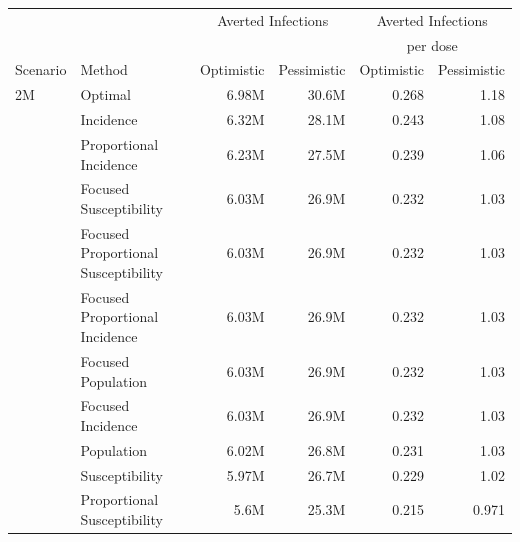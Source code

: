 
\begin{fwtable}
\centering
\small
\begin{tabular}{llrrrr}
\toprule
& {} & \multicolumn{2}{c}{Averted Infections} & \multicolumn{2}{c}{Averted Infections} \\
&    &  & & \multicolumn{2}{c}{per dose} \\
Scenario & Method &  Optimistic & Pessimistic &     Optimistic & Pessimistic          \\
\midrule
2M & Optimal &   6.98M &    30.6M &          0.268 &        1.18 \\
        & Incidence &   6.32M &    28.1M &          0.243 &        1.08 \\
        & Proportional Incidence &   6.23M &    27.5M &          0.239 &        1.06 \\
        & Focused Susceptibility &   6.03M &    26.9M &          0.232 &        1.03 \\
        & Focused Proportional Susceptibility &   6.03M &    26.9M &          0.232 &        1.03 \\
        & Focused Proportional Incidence &   6.03M &    26.9M &          0.232 &        1.03 \\
        & Focused Population &   6.03M &    26.9M &          0.232 &        1.03 \\
        & Focused Incidence &   6.03M &    26.9M &          0.232 &        1.03 \\
        & Population &   6.02M &    26.8M &          0.231 &        1.03 \\
        & Susceptibility &   5.97M &    26.7M &          0.229 &        1.02 \\
        & Proportional Susceptibility &    5.6M &    25.3M &          0.215 &       0.971 \\

\end{tabular}
\end{fwtable}
